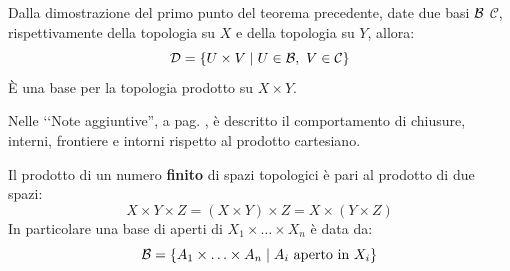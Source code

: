 \begin{observe}
	Dalla dimostrazione del primo punto del teorema precedente, date due basi $\mathcal{B}$ $\mathcal{C}$, rispettivamente della topologia su $X$ e della topologia su $Y$, allora:
	\begin{equation}
		\mathcal{D}=\left\{U\times V\mid U\in\mathcal{B},\ V\in\mathcal{C}\right\}
	\end{equation}
	È una base per la topologia prodotto su $X\times Y$.
\end{observe}
Nelle ‘‘Note aggiuntive'', a pag. \pageref{topologiaprodottostruttura}, è descritto il comportamento di chiusure, interni, frontiere e intorni rispetto al prodotto cartesiano.
\begin{observe}
Il prodotto di un numero \textbf{finito} di spazi topologici è pari al prodotto di due spazi:
\begin{equation*}
X\times Y\times Z=\left(X\times Y\right)\times Z=X\times\left(Y\times Z\right)
\end{equation*}
In particolare una base di aperti di $X_1\times \ldots \times X_n$ è data da:
\begin{equation*}
\mathcal{B}=\left\{A_1\times \ldots \times A_n\mid A_i\text{ aperto in } X_i\right\}
\end{equation*}
\vspace{-6mm}
\end{observe}
